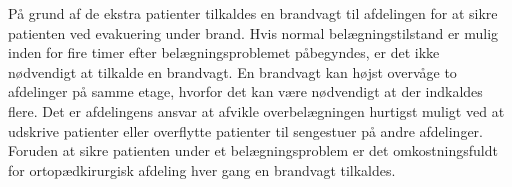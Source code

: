 På grund af de ekstra patienter tilkaldes en brandvagt til afdelingen for at sikre patienten ved evakuering under brand. Hvis normal belægningstilstand er mulig inden for fire timer efter belægningsproblemet påbegyndes, er det ikke nødvendigt at tilkalde en brandvagt. En brandvagt kan højst overvåge to afdelinger på samme etage, hvorfor det kan være nødvendigt at der indkaldes flere. Det er afdelingens ansvar at afvikle overbelægningen hurtigst muligt ved at udskrive patienter eller overflytte patienter til sengestuer på andre afdelinger. \cite{Beredskab2016} Foruden at sikre patienten under et belægningsproblem er det omkostningsfuldt for ortopædkirurgisk afdeling hver gang en brandvagt tilkaldes.  


